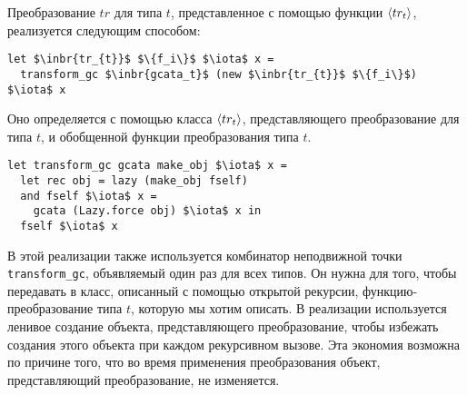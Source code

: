 
Преобразование $tr$ для типа $t$, представленное с помощью функции $\left<tr_{t}\right>$, реализуется следующим способом:

\begin{lstlisting}
let $\inbr{tr_{t}}$ $\{f_i\}$ $\iota$ x =
  transform_gc $\inbr{gcata_t}$ (new $\inbr{tr_{t}}$ $\{f_i\}$) $\iota$ x
\end{lstlisting}
\noindent Оно определяется с помощью класса  $\left<tr_{t}\right>$, представляющего преобразование для типа $t$, и обобщенной функции преобразования типа $t$. 

\begin{lstlisting}
let transform_gc gcata make_obj $\iota$ x =
  let rec obj = lazy (make_obj fself)
  and fself $\iota$ x = 
    gcata (Lazy.force obj) $\iota$ x in
  fself $\iota$ x
\end{lstlisting}

\noindent В этой реализации также используется комбинатор неподвижной точки \lstinline{transform_gc}, объявляемый один раз для всех типов. Он нужна для того, чтобы передавать в класс, описанный с помощью открытой рекурсии, функцию-преобразование типа $t$, которую мы хотим описать. В реализации используется ленивое создание объекта, представляющего преобразование, чтобы избежать создания этого объекта при каждом рекурсивном вызове. Эта экономия возможна по причине того, что во время применения преобразования объект, представляющий преобразование, не изменяется.



